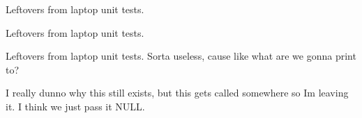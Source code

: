 
\begin{DoxyRefList}
\item[Global \mbox{\hyperlink{rb__tree_8c_aa02803c2713094e61fa50807fa7a5116}{rb\+Check\+Black\+Height}} (rbtree $\ast$rbt)]\label{deprecated__deprecated000003}%
%
Leftovers from laptop unit tests. 
\item[Global \mbox{\hyperlink{rb__tree_8c_a0eb9842e366817eb18eac0e319fb04db}{rb\+Check\+Order}} (rbtree $\ast$rbt, void $\ast$min, void $\ast$max)]\label{deprecated__deprecated000002}%
%
Leftovers from laptop unit tests. 
\item[Global \mbox{\hyperlink{rb__tree_8c_a447d21f412285d3455356d2975a6ced3}{rb\+Print}} (rbtree $\ast$rbt, void($\ast$print\+\_\+func)(void $\ast$))]\label{deprecated__deprecated000001}%
%
Leftovers from laptop unit tests. Sorta useless, cause like what are we gonna print to?  
\item[Global \mbox{\hyperlink{uvfr__utils_8c_ab80c00a024c34da7f7926212ce10ef01}{setup\+\_\+extern\+\_\+devices}} (void $\ast$argument)]\label{deprecated__deprecated000005}%
%
I really dunno why this still exists, but this gets called somewhere so Im leaving it. I think we just pass it N\+U\+LL. 
\item[Global \mbox{\hyperlink{uvfr__settings_8c_a8e128ab49bfb636a4597802418066784}{uv\+Force\+Default\+Reversion\+Upon\+Device\+Reset}} ()]\label{deprecated__deprecated000004}%
%

\end{DoxyRefList}